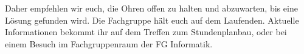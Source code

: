 Daher empfehlen wir euch, die Ohren offen zu halten und abzuwarten, bis eine Lösung gefunden wird. Die Fachgruppe hält euch auf dem Laufenden. Aktuelle Informationen bekommt ihr auf dem Treffen zum Stundenplanbau, oder bei einem Besuch im Fachgruppenraum der FG Informatik.






